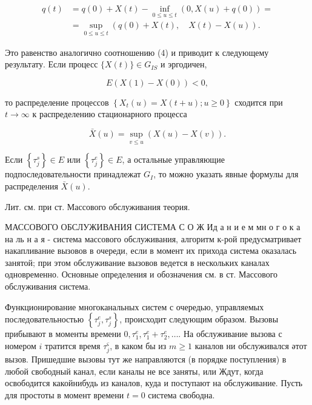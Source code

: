 \documentclass[10pt]{article}
\begin{document}
\[

\begin{aligned}

q(t) & =q(0)+X(t)-\inf _{0 \leqslant u \leqslant t}(0, X(u)+q(0))= \\

& =\sup _{0 \leqslant u \leqslant t}(q(0)+X(t), \quad X(t)-X(u)) .

\end{aligned}

\]



Это равенство аналогично соотношению (4) и приводит к следующему результату. Если процесс $\{X(t)\} \in G_{I S}$ и эргодичен,



\[

E(X(1)-X(0))<0,

\]



то распределение процессов $\left\{X_{t}(u)=X(t+u) ; u \geqslant 0\right\}$ сходится при $t \rightarrow \infty$ к распределению стационарного процесса



\[

\bar{X}(u)=\sup _{v \leqslant u}(X(u)-X(v)) .

\]



Если $\left\{\tau_{j}^{s}\right\} \in E$ или $\left\{\tau_{j}^{e}\right\} \in E$, а остальные управляющие подпоследовательности принадлежат $G_{I}$, то можно указать явные формулы для распределения $\bar{X}(u)$.



Лит. см. при ст. Массового обслуживания теория.



МАССОВОГО ОБСЛУЖИВАНИЯ СИСТЕМА С О Ж Ид а н и е м мн о г о к а на ль н а я - система массового обслуживания, алгоритм к-рой предусматривает накапливание вызовов в очереди, если в момент их прихода система оказалась занятой; при этом обслуживание вызовов ведется в нескольких каналах одновременно. Основные определения и обозначения см. в ст. Массового обслуживания система.



Функционирование многоканальных систем с очередью, управляемых последовательностью $\left\{\tau_{j}^{e}, \tau_{j}^{s}\right\}$, происходит следующим образом. Вызовы прибывают в моменты времени $0, \tau_{1}^{e}, \tau_{1}^{e}+\tau_{2}^{e}, \ldots$. На обслуживание вызова с номером $i$ тратится время $\tau_{j}^{\varsigma}$, в каком бы из $m \geqslant 1$ каналов ни обслуживался әтот вызов. Пришедшие вызовы тут же направляются (в порядке поступления) в любой свободный канал, если каналы не все заняты, или Ждут, когда освободится какойнибудь из каналов, куда и поступают на обслуживание. Пусть для простоты в момент времени $t=0$ система свободна.
\end{document}
